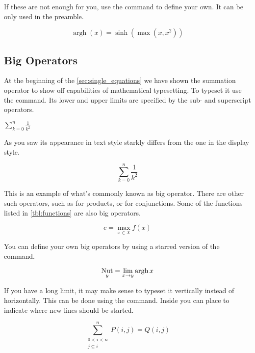 If these are not enough for you, use the  command to
define your own. It can be only used in the preamble.
\begin{example}[vertical_mode, examplewidth=0.6\linewidth]
\DeclareMathOperator{\argh}{argh}
\[ \argh(x) = \sinh(\max(x, x^2)) \]
\end{example}

\subsection{Big Operators}

At the beginning of the \autoref{sec:single_equations} we have shown the
summation operator to show off capabilities of mathematical typesetting. To
typeset it use the  command. Its lower and upper limits are specified
by the sub- and superscript operators.
\begin{example}
\(
  \sum_{k=0}^{n} \frac{1}{k^2}
\)
\end{example}
As you saw its appearance in text style starkly differs from the one in the
display style.
\begin{example}
\[
  \sum_{k=0}^{n} \frac{1}{k^2}
\]
\end{example}

This is an example of what's commonly known as big operator. There are other
such operators, such as  for products, or  for
conjunctions. Some of the functions listed in \autoref{tbl:functions} are also
big operators.
\begin{example}
\[
  c = \max_{x\in X} f(x)
\]
\end{example}

You can define your own big operators by using a starred version of the
 command.
\begin{example}[vertical_mode, examplewidth=0.6\linewidth]
\DeclareMathOperator*{\nut}{Nut}
\[ \nut_y = \lim_{x \to y} \argh{x} \]
\end{example}

If you have a long limit, it may make sense to typeset it vertically instead of
horizontally. This can be done using the  command. Inside you can
place \cs{\bs} to indicate where new lines should be started.
\begin{example}
\[
  \sum^n_{
    \substack{0<i<n \\ 
    j\subseteq i}
  }
   P(i,j) = Q(i,j)
\]
\end{example}


